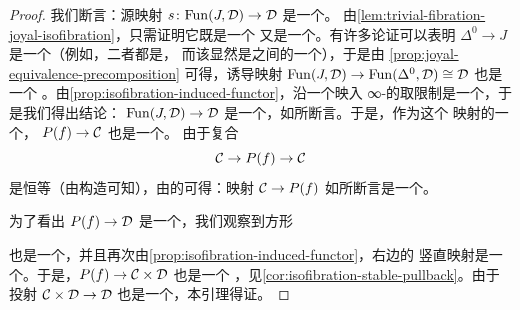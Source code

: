 \begin{proof}
我们断言：源映射 $s\colon \mathrm{Fun}(J, \mathcal{D}) \to \mathcal{D}$ 是一个\trTrivialFibration{}。
由\cref{lem:trivial-fibration-joyal-isofibration}，只需证明它既是一个%
\trJoyalEquivalence{}又是一个\trIsofibration{}。有许多论证可以表明
$\Delta^0 \to J$ 是一个\trJoyalEquivalence{}（例如，二者都是\trOrdinaryCategory{}，
而该\trFunctor{}显然是\trOrdinaryCategory{}之间的一个\trEquivalence{}），于是由%
\cref{prop:joyal-equivalence-precomposition} 可得，诱导映射
$\mathrm{Fun}(J, \mathcal{D}) \to \mathrm{Fun}(\Delta^0, \mathcal{D}) \cong \mathcal{D}$ 也是一个%
\trJoyalEquivalence{}。由\cref{prop:isofibration-induced-functor}，沿一个映入
∞-\trCategory{}的\trMonomorphism{}取限制是一个\trIsofibration{}，于是我们得出结论：
$\mathrm{Fun}(J, \mathcal{D}) \to \mathcal{D}$ 是一个\trTrivialFibration{}，如所断言。于是，作为这个
映射的一个\trPullback{}，\trFunctor{} $P(f) \to \mathcal{C}$ 也是一个\trTrivialFibration{}。
由于复合
\[
\mathcal{C} \to P(f) \to \mathcal{C}
\]
是恒等（由构造可知），由\trJoyalEquivalence{}的\trThreeForTwoProperty{}可得：映射
$\mathcal{C} \to P(f)$ 如所断言是一个\trJoyalEquivalence{}。

为了看出 $P(f) \to \mathcal{D}$ 是一个\trIsofibration{}，我们观察到方形
\begin{center}
\end{center}
也是一个\trPullback{}，并且再次由\cref{prop:isofibration-induced-functor}，右边的
竖直映射是一个\trIsofibration{}。于是，$P(f) \to \mathcal{C} \times \mathcal{D}$ 也是一个%
\trIsofibration{}，见\cref{cor:isofibration-stable-pullback}。由于投射
$\mathcal{C} \times \mathcal{D} \to \mathcal{D}$ 也是一个\trIsofibration{}，本引理得证。
\end{proof}
